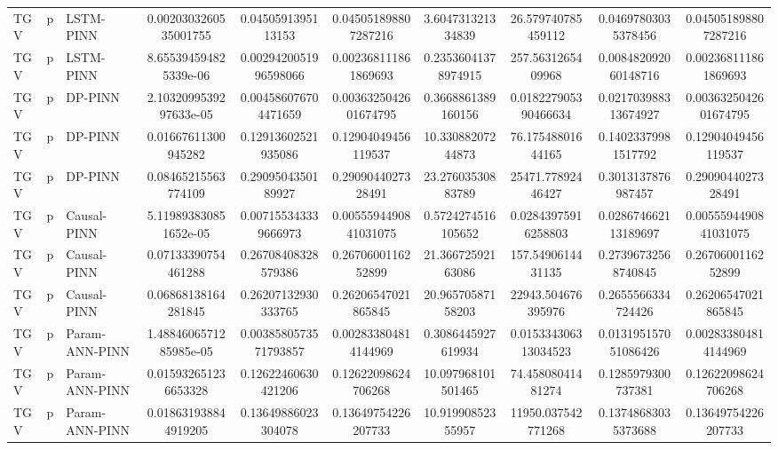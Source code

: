 \begin{landscape}
\begin{longtable}{lllccccccc}
 TGV &     p &      LSTM-PINN &  0.0020303260535001755 &     0.0450591395113153 &   0.045051898807287216 &    3.604731321334839 &    26.579740785459112 &   0.04697803035378456 &   0.045051898807287216 \\
 TGV &     p &      LSTM-PINN &  8.655394594825339e-06 &  0.0029420051996598066 &   0.002368111861869693 &  0.23536041378974915 &     257.5631265409968 &  0.008482092060148716 &   0.002368111861869693 \\
 TGV &     p &        DP-PINN & 2.1032099539297633e-05 &   0.004586076704471659 &  0.0036325042601674795 &   0.3668861389160156 &  0.018227905390466634 &  0.021703988313674927 &  0.0036325042601674795 \\
 TGV &     p &        DP-PINN &    0.01667611300945282 &    0.12913602521935086 &    0.12904049456119537 &    10.33088207244873 &     76.17548801644165 &   0.14023379981517792 &    0.12904049456119537 \\
 TGV &     p &        DP-PINN &    0.08465215563774109 &     0.2909504350189927 &     0.2909044027328491 &    23.27603530883789 &     25471.77892446427 &    0.3013137876987457 &     0.2909044027328491 \\
 TGV &     p &    Causal-PINN &  5.119893830851652e-05 &   0.007155343339666973 &  0.0055594490841031075 &   0.5724274516105652 &   0.02843975916258803 &  0.028674662113189697 &  0.0055594490841031075 \\
 TGV &     p &    Causal-PINN &    0.07133390754461288 &    0.26708408328579386 &     0.2670600116252899 &    21.36672592163086 &     157.5490614431135 &   0.27396732568740845 &     0.2670600116252899 \\
 TGV &     p &    Causal-PINN &    0.06868138164281845 &    0.26207132930333765 &    0.26206547021865845 &    20.96570587158203 &    22943.504676395976 &    0.2655566334724426 &    0.26206547021865845 \\
 TGV &     p & Param-ANN-PINN & 1.4884606571285985e-05 &  0.0038580573571793857 &   0.002833804814144969 &   0.3086445927619934 &  0.015334306313034523 &  0.013195157051086426 &   0.002833804814144969 \\
 TGV &     p & Param-ANN-PINN &   0.015932651236653328 &    0.12622460630421206 &    0.12622098624706268 &   10.097968101501465 &     74.45808041481274 &    0.1285979300737381 &    0.12622098624706268 \\
 TGV &     p & Param-ANN-PINN &   0.018631938844919205 &    0.13649886023304078 &    0.13649754226207733 &    10.91990852355957 &    11950.037542771268 &   0.13748683035373688 &    0.13649754226207733 \\

\end{longtable}
\end{landscape}
